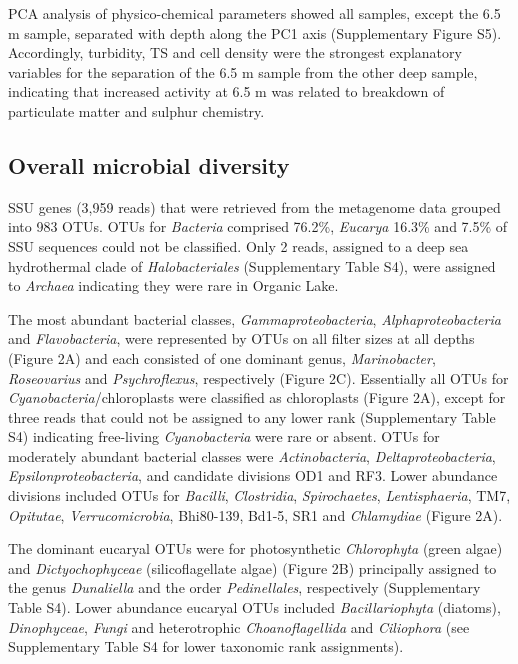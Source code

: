 \ac{PCA} analysis of physico-chemical parameters showed all samples, except the 6.5 m sample, separated with depth along the PC1 axis (Supplementary Figure S5). 
Accordingly, turbidity, \ac{TS} and cell density were the strongest explanatory variables for the separation of the 6.5 m sample from the other deep sample, indicating that increased activity at 6.5 m was related to breakdown of particulate matter and sulphur chemistry.

\subsection{Overall microbial diversity}
\ac{SSU} genes (3,959 reads) that were retrieved from the metagenome data grouped into 983 \acp{OTU}. 
\acp{OTU} for \emph{Bacteria} comprised 76.2\%, \emph{Eucarya} 16.3\% and 7.5\% of \ac{SSU} sequences could not be classified. 
Only 2 reads, assigned to a deep sea hydrothermal clade of \emph{Halobacteriales} (Supplementary Table S4), were assigned to \emph{Archaea} indicating they were rare in Organic Lake.
 
The most abundant bacterial classes, \emph{Gammaproteobacteria}, \emph{Alphaproteobacteria} and \emph{Flavobacteria}, were represented by \acp{OTU} on all filter sizes at all depths (Figure 2A) and each consisted of one dominant genus, \emph{Marinobacter}, \emph{Roseovarius} and \emph{Psychroflexus}, respectively (Figure 2C). 
Essentially all \acp{OTU} for \emph{Cyanobacteria}/chloroplasts were classified as chloroplasts (Figure 2A), except for three reads that could not be assigned to any lower rank (Supplementary Table S4) indicating free-living \emph{Cyanobacteria} were rare or absent. 
\acp{OTU} for moderately abundant bacterial classes were \emph{Actinobacteria}, \emph{Deltaproteobacteria}, \emph{Epsilonproteobacteria}, and candidate divisions OD1 and RF3. 
Lower abundance divisions included \acp{OTU} for \emph{Bacilli}, \emph{Clostridia}, \emph{Spirochaetes}, \emph{Lentisphaeria}, TM7, \emph{Opitutae}, \emph{Verrucomicrobia}, Bhi80-139, Bd1-5, SR1 and \emph{Chlamydiae} (Figure 2A).

 The dominant eucaryal \acp{OTU} were for photosynthetic \emph{Chlorophyta} (green algae) and \emph{Dictyochophyceae} (silicoflagellate algae) (Figure 2B) principally assigned to the genus \emph{Dunaliella} and the order \emph{Pedinellales}, respectively (Supplementary Table S4). 
Lower abundance eucaryal \acp{OTU} included \emph{Bacillariophyta} (diatoms), \emph{Dinophyceae}, \emph{Fungi} and heterotrophic \emph{Choanoflagellida} and \emph{Ciliophora} (see Supplementary Table S4 for lower taxonomic rank assignments). 


